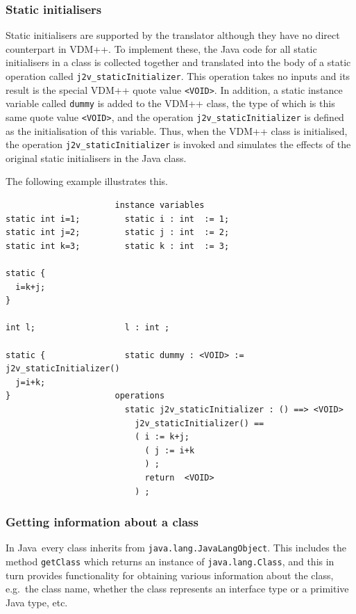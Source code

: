 \documentclass[\pformat,12pt]{article}
\newcommand{\JAVA}{Java}
\begin{document}
\subsubsection{Static initialisers}

Static initialisers are supported by the translator although they have
no direct counterpart in VDM++. To implement these, the Java code for
all static initialisers in a class is collected together and
translated into the body of a static operation called
\texttt{j2v\_staticInitializer}. This operation takes no inputs and
its result is the special VDM++ quote value \texttt{<VOID>}. In
addition, a static instance variable called \texttt{dummy} is added to
the VDM++ class, the type of which is this same quote value
\texttt{<VOID>}, and the operation \texttt{j2v\_staticInitializer} is
defined as the initialisation of this variable. Thus, when the VDM++
class is initialised, the operation \texttt{j2v\_staticInitializer} is
invoked and simulates the effects of the original static initialisers
in the Java class. 

The following example illustrates this.

\begin{small}
\begin{verbatim}
                      instance variables
static int i=1;         static i : int  := 1;
static int j=2;         static j : int  := 2;
static int k=3;         static k : int  := 3;

static {
  i=k+j;
}

int l;                  l : int ;
                        
static {                static dummy : <VOID> := j2v_staticInitializer()
  j=i+k;              
}                     operations
                        static j2v_staticInitializer : () ==> <VOID>
                          j2v_staticInitializer() ==
                          ( i := k+j;
                            ( j := i+k
                            ) ;
                            return  <VOID>
                          ) ;
\end{verbatim}
\end{small}



\subsubsection{Getting information about a class}\label{getclass}

In \JAVA\ every class inherits from \texttt{java.lang.JavaLangObject}.
This includes the method \texttt{getClass} which returns an instance
of \texttt{java.lang.Class}, and this in turn provides functionality
for obtaining various information about the class, e.g.\ the class
name, whether the class represents an interface type or a primitive
Java type, etc. 
\end{document}
